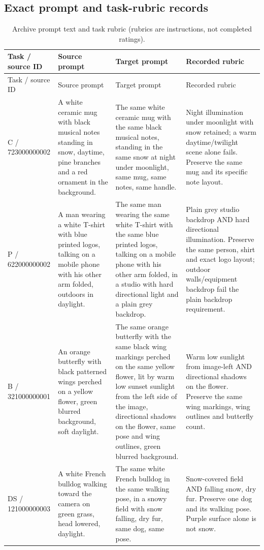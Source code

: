 \subsection{Exact prompt and task-rubric records}

\begingroup\scriptsize\setlength{\tabcolsep}{2pt}
\begin{longtable}{p{.14\linewidth}p{.26\linewidth}p{.27\linewidth}p{.25\linewidth}}
\caption{Archive prompt text and task rubric (rubrics are instructions, not completed ratings).}\\
\hline
Task / source ID & Source prompt & Target prompt & Recorded rubric \\ \hline
\endfirsthead
\hline
Task / source ID & Source prompt & Target prompt & Recorded rubric \\ \hline
\endhead
C / 723000000002 & A white ceramic mug with black musical notes standing in snow, daytime, pine branches and a red ornament in the background. & The same white ceramic mug with the same black musical notes, standing in the same snow at night under moonlight, same mug, same notes, same handle. & Night illumination under moonlight with snow retained; a warm daytime/twilight scene alone fails. Preserve the same mug and its specific note layout. \\
P / 622000000002 & A man wearing a white T-shirt with blue printed logos, talking on a mobile phone with his other arm folded, outdoors in daylight. & The same man wearing the same white T-shirt with the same blue printed logos, talking on a mobile phone with his other arm folded, in a studio with hard directional light and a plain grey backdrop. & Plain grey studio backdrop AND hard directional illumination. Preserve the same person, shirt and exact logo layout; outdoor walls/equipment backdrop fail the plain backdrop requirement. \\
B / 321000000001 & An orange butterfly with black patterned wings perched on a yellow flower, green blurred background, soft daylight. & The same orange butterfly with the same black wing markings perched on the same yellow flower, lit by warm low sunset sunlight from the left side of the image, directional shadows on the flower, same pose and wing outlines, green blurred background. & Warm low sunlight from image-left AND directional shadows on the flower. Preserve the same wing markings, wing outlines and butterfly count. \\
DS / 121000000003 & A white French bulldog walking toward the camera on green grass, head lowered, daylight. & The same white French bulldog in the same walking pose, in a snowy field with snow falling, dry fur, same dog, same pose. & Snow-covered field AND falling snow, dry fur. Preserve one dog and its walking pose. Purple surface alone is not snow. \\

\end{longtable}
